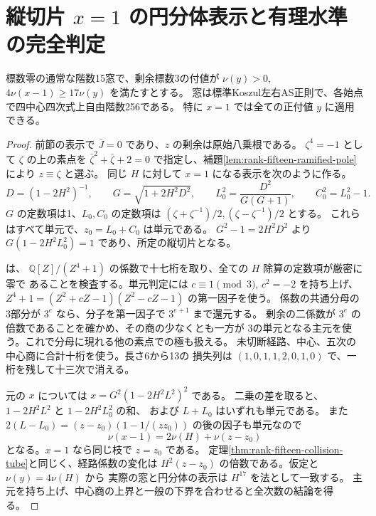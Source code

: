 \section{縦切片 $x=1$ の円分体表示と有理水準の完全判定}
\label{sec:rank-fifteen-vertical-one}
\begin{theorem}\label{thm:rank-fifteen-vertical-one-tube}
標数零の通常な階数15窓で、剰余標数3の付値が
$\nu(y)>0$, $4\nu(x-1)\ge17\nu(y)$ を満たすとする。
窓は標準Koszul左右AS正則で、各始点で四中心四次式上自由階数256である。
特に $x=1$ では全ての正付値 $y$ に適用できる。
\end{theorem}
\begin{proof}
前節の表示で $\bar J=0$ であり、$z$ の剰余は原始八乗根である。
$\zeta^4=-1$ として $\zeta$ の上の素点を $\bar\zeta^2+\bar\zeta+2=0$
で指定し、補題\ref{lem:rank-fifteen-ramified-pole}により $z\equiv\zeta$ と選ぶ。
同じ $H$ に対して $x=1$ になる表示を次のように作る。
\[
 D=(1-2H^2)^{-1},\qquad G=\sqrt{1+2H^2D^2},\qquad
 L_0^2=\frac{D^2}{G(G+1)},\qquad C_0^2=L_0^2-1 .
\]
$G$ の定数項は1、$L_0,C_0$ の定数項は
$(\zeta+\zeta^{-1})/2,(\zeta-\zeta^{-1})/2$ とする。
これらはすべて単元で、$z_0=L_0+C_0$ は単元である。
$G^2-1=2H^2D^2$ より $G(1-2H^2L_0^2)=1$ であり、所定の縦切片となる。

 は、
$\mathbb Q[Z]/(Z^4+1)$ の係数で十七桁を取り、全ての $H$ 除算の定数項が厳密に零で
あることを検査する。単元判定には $c\equiv1\pmod3$, $c^2=-2$ を持ち上げ、
$Z^4+1=(Z^2+cZ-1)(Z^2-cZ-1)$ の第一因子を使う。
係数の共通分母の3部分が $3^e$ なら、分子を第一因子で $3^{e+1}$ まで還元する。
剰余の二係数が $3^e$ の倍数であることを確かめ、その商の少なくとも一方が
3の単元となる主元を使う。これで分母に現れる他の素点での極も扱える。
未切断経路、中心、五次の中心商に合計十桁を使う。長さ6から13の
損失列は $(1,0,1,1,2,0,1,0)$ で、一桁を残して十三次で消える。

元の $x$ については $x=G^2(1-2H^2L^2)^2$ である。
二乗の差を取ると、$1-2H^2L^2$ と $1-2H^2L_0^2$ の和、
および $L+L_0$ はいずれも単元である。
また $2(L-L_0)=(z-z_0)(1-1/(zz_0))$ の後の因子も単元なので
\[
                  \nu(x-1)=2\nu(H)+\nu(z-z_0)
\]
となる。$x=1$ なら同じ枝で $z=z_0$ である。
定理\ref{thm:rank-fifteen-collision-tube}と同じく、経路係数の変化は
$H^2(z-z_0)$ の倍数である。仮定と $\nu(y)=4\nu(H)$ から
実際の窓と円分体の表示は $H^{17}$ を法として一致する。
主元を持ち上げ、中心商の上界と一般の下界を合わせると全次数の結論を得る。
\end{proof}

